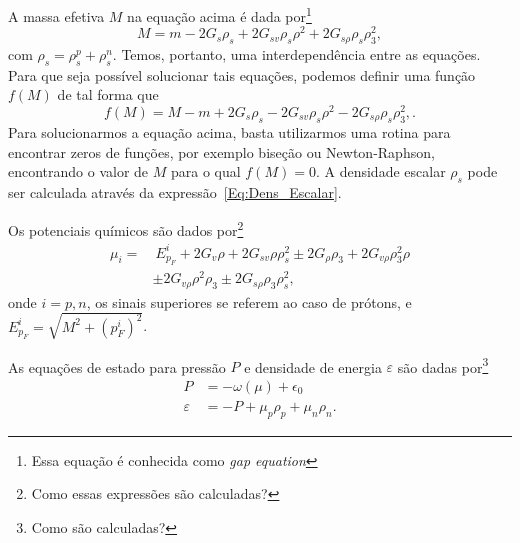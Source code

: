 A massa efetiva $M$ na equação acima é dada por\footnote{Essa equação é conhecida como \emph{gap equation}}
\begin{equation}\label{Eq:Gap}
	M = m - 2G_s\rho_s + 2G_{sv}\rho_s\rho^2 + 2 G_{s\rho}\rho_s\rho_3^2,
\end{equation}
%
com $\rho_s = \rho_s^p + \rho_s^n$. Temos, portanto, uma interdependência entre as equações. Para que seja possível solucionar tais equações, podemos definir uma função $f(M)$ de tal forma que
\begin{equation}\label{Eq:Gap_zero}
	f(M) = M - m + 2G_s\rho_s - 2G_{sv}\rho_s\rho^2 - 2 G_{s\rho}\rho_s\rho_3^2,.
\end{equation}
%
Para solucionarmos a equação acima, basta utilizarmos uma rotina para encontrar zeros de funções, por exemplo biseção ou Newton-Raphson, encontrando o valor de $M$ para o qual $f(M) = 0$. A densidade escalar $\rho_s$ pode ser calculada através da expressão~\eqref{Eq:Dens_Escalar}.

Os potenciais químicos são dados por\footnote{Como essas expressões são calculadas?}
\begin{equation}\label{Eq:Potenciais_Quimicos}
\begin{split}
	\mu_i =&~ E_{p_F}^i + 2G_v\rho + 2G_{sv}\rho\rho_s^2 \pm 2G_\rho\rho_3+2G_{v\rho}\rho_3^2\rho \\
	& \pm 2G_{v\rho}\rho^2\rho_3 \pm 2 G_{s\rho}\rho_3\rho_s^2,
\end{split}
\end{equation}
%
onde $i = p,n$, os sinais superiores se referem ao caso de prótons, e $E_{p_F}^i = \sqrt{M^2 + (p_F^i)^2}$.

As equações de estado para pressão $P$ e densidade de energia $\varepsilon$ são dadas por\footnote{Como são calculadas?}
\begin{align}
	P &= -\omega(\mu) + \epsilon_0 \label{Eq:Pressao}\\
	\varepsilon &= -P + \mu_p\rho_p + \mu_n\rho_n. \label{Eq:Densidade_energia}
\end{align}

